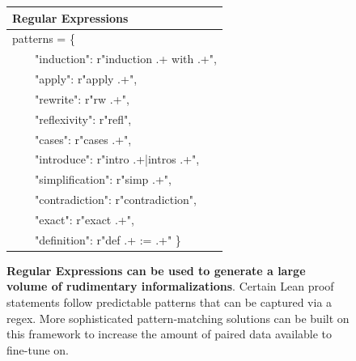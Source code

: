 \documentclass{article} %
\begin{document}
\begin{figure}[ht]
\centering
\begin{tabular}{|l|}
\hline
\textbf{Regular Expressions} \\
\hline
\ttfamily patterns = \{ \\
\ \ \ \ "induction": r"induction .+ with .+", \\
\ \ \ \ "apply": r"apply .+", \\
\ \ \ \ "rewrite": r"rw .+", \\
\ \ \ \ "reflexivity": r"refl", \\
\ \ \ \ "cases": r"cases .+", \\
\ \ \ \ "introduce": r"intro .+|intros .+", \\
\ \ \ \ "simplification": r"simp .+", \\
\ \ \ \ "contradiction": r"contradiction", \\
\ \ \ \ "exact": r"exact .+", \\
\ \ \ \ "definition": r"def .+ := .+" \} \\
\hline
\end{tabular}
\caption{\textbf{Regular Expressions can be used to generate a large volume of rudimentary informalizations}. Certain Lean proof statements follow predictable patterns that can be captured via a regex. More sophisticated pattern-matching solutions can be built on this framework to increase the amount of paired data available to fine-tune on.}
\label{figure:regular_expressions}
\end{figure}
\end{document}

